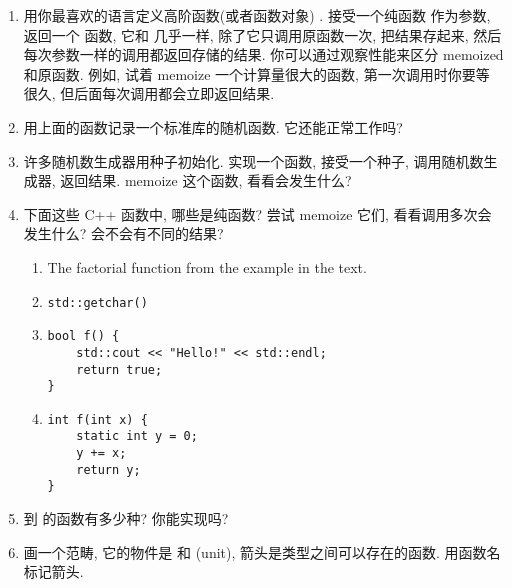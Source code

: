 \begin{enumerate}
  \tightlist
  \item
        用你最喜欢的语言定义高阶函数(或者函数对象) . 接受一个纯函数  作为参数, 返回一个
        函数, 它和  几乎一样, 除了它只调用原函数一次, 把结果存起来, 然后每次参数一样的调用都返回存储的结果.
        你可以通过观察性能来区分 memoized 和原函数. 例如, 试着 memoize 一个计算量很大的函数, 第一次调用时你要等
        很久, 但后面每次调用都会立即返回结果.
  \item
        用上面的函数记录一个标准库的随机函数. 它还能正常工作吗?
  \item
        许多随机数生成器用种子初始化. 实现一个函数, 接受一个种子, 调用随机数生成器, 返回结果. memoize 这个函数,
        看看会发生什么?
  \item
        下面这些 C++ 函数中, 哪些是纯函数? 尝试 memoize 它们, 看看调用多次会发生什么? 会不会有不同的结果?

        \begin{enumerate}
          \tightlist
          \item
                The factorial function from the example in the text.
          \item
                \begin{verbatim}
std::getchar()
\end{verbatim}
          \item
                \begin{verbatim}
bool f() {
    std::cout << "Hello!" << std::endl;
    return true;
}
\end{verbatim}
          \item
                \begin{verbatim}
int f(int x) {
    static int y = 0;
    y += x;
    return y;
}
\end{verbatim}
        \end{enumerate}
  \item
         到  的函数有多少种? 你能实现吗?
  \item
        画一个范畴, 它的物件是  和 \code{()} (unit), 箭头是类型之间可以存在的函数.
        用函数名标记箭头.
\end{enumerate}
